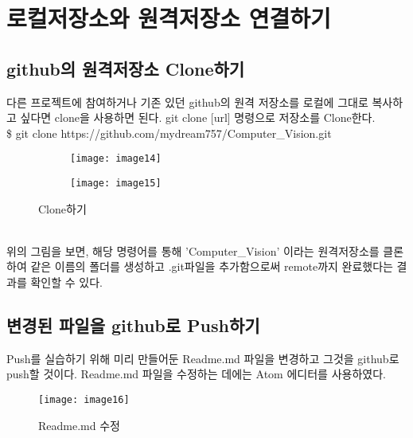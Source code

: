 \documentclass[titlepage]{article}
\begin{document}
\section{ 로컬저장소와 원격저장소 연결하기}

		\subsection{ github의 원격저장소 Clone하기}
		다른 프로젝트에 참여하거나 기존 있던 github의 원격 저장소를 로컬에 그대로 복사하고 싶다면 clone을 사용하면 된다.
git clone [url] 명령으로 저장소를 Clone한다. \\

\$ git clone https://github.com/mydream757/Computer\_Vision.git\\
\begin{figure}[h]
 
		\begin{subfigure}{0.5\textwidth}
		\texttt{[image: image14]} 
		\end{subfigure}
		\begin{subfigure}{0.5\textwidth}
		\texttt{[image: image15]}
		
	
		\end{subfigure}
 
		\caption{Clone하기}
		\label{fig:figure8}
		\end{figure}
		\\
위의 그림을 보면, 해당 명령어를 통해 'Computer\_Vision' 이라는 원격저장소를 클론하여 같은 이름의 폴더를 생성하고 .git파일을 추가함으로써 remote까지 완료했다는 결과를 확인할 수 있다.\\
		
		\subsection{변경된 파일을 github로 Push하기}
Push를 실습하기 위해 미리 만들어둔 Readme.md 파일을 변경하고 그것을 github로 push할 것이다. 
Readme.md 파일을 수정하는 데에는 Atom 에디터를 사용하였다.\\
\begin{figure}[h]
		\texttt{[image: image16]}
		\caption{Readme.md 수정}
		\label{fig:figure9}
		\end{figure}
\end{document}
